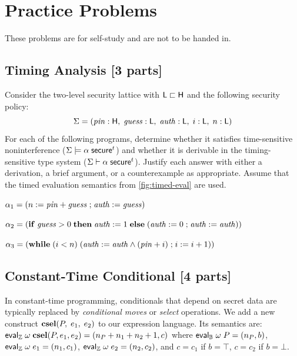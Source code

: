 \documentclass[11pt]{article}
\newcommand{\tm}{t}
\begin{document}
\section{Practice Problems}

These problems are for self-study and are not to be handed in.

\subsection{Timing Analysis [3 parts]}

Consider the two-level security lattice with $\mathsf{L} \sqsubset \mathsf{H}$ and
the following security policy:
\[
  \Sigma = (\mathit{pin} : \mathsf{H},\; \mathit{guess} : \mathsf{L},\; \mathit{auth} : \mathsf{L},\; i : \mathsf{L},\; n : \mathsf{L})
\]
For each of the following programs, determine whether it satisfies
time-sensitive noninterference ($\Sigma \models \alpha\; \ms{secure}^\tm$) and
whether it is derivable in the timing-sensitive type system
($\Sigma \vdash \alpha\; \ms{secure}^\tm$).  Justify each answer with either
a derivation, a brief argument, or a counterexample as appropriate.  Assume
that the timed evaluation semantics from \autoref{fig:timed-eval} are used.

\begin{task}\rm
  \label{task:p1a}
  $\alpha_1 = (n := \mathit{pin} + \mathit{guess} \mathrel{;} \mathit{auth} := \mathit{guess})$
\end{task}

\begin{task}\rm
  \label{task:p1b}
  $\alpha_2 = (\mathbf{if}\; \mathit{guess} > 0\; \mathbf{then}\; \mathit{auth} := 1\;
  \mathbf{else}\; (\mathit{auth} := 0 \mathrel{;} \mathit{auth} := \mathit{auth}))$
\end{task}

\begin{task}\rm
  \label{task:p1c}
  $\alpha_3 = (\mathbf{while}\; (i < n)\;
  (\mathit{auth} := \mathit{auth} \land (\mathit{pin} + i) \mathrel{;} i := i + 1))$
\end{task}

\subsection{Constant-Time Conditional [4 parts]}

In constant-time programming, conditionals that depend on secret data are
typically replaced by \emph{conditional moves} or \emph{select} operations.
We add a new construct $\mathbf{csel}(P,\; e_1,\; e_2)$ to our expression language.
Its semantics are: $\mathsf{eval}_{\mathbb{Z}}\; \omega\; \mathbf{csel}(P, e_1, e_2) = (n_P + n_1 + n_2 + 1, c)$
where $\mathsf{eval}_{\mathbb{B}}\; \omega\; P = (n_P, b)$, $\mathsf{eval}_{\mathbb{Z}}\; \omega\; e_1 = (n_1, c_1)$,
$\mathsf{eval}_{\mathbb{Z}}\; \omega\; e_2 = (n_2, c_2)$, and
$c = c_1$ if $b = \top$, $c = c_2$ if $b = \bot$.
\end{document}
